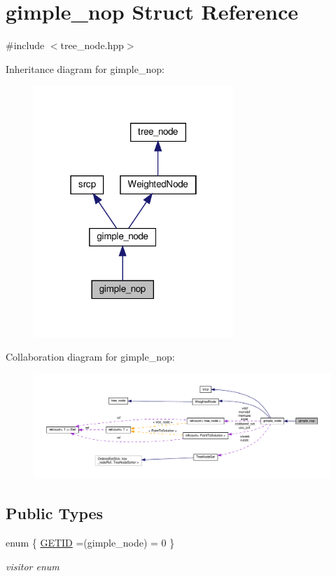 \hypertarget{structgimple__nop}{}\section{gimple\+\_\+nop Struct Reference}
\label{structgimple__nop}


{\ttfamily \#include $<$tree\+\_\+node.\+hpp$>$}



Inheritance diagram for gimple\+\_\+nop\+:
\nopagebreak
\begin{figure}[H]
\begin{center}
\leavevmode
\includegraphics[width=214pt]{dd/dda/structgimple__nop__inherit__graph}
\end{center}
\end{figure}


Collaboration diagram for gimple\+\_\+nop\+:
\nopagebreak
\begin{figure}[H]
\begin{center}
\leavevmode
\includegraphics[width=350pt]{d9/d32/structgimple__nop__coll__graph}
\end{center}
\end{figure}
\subsection*{Public Types}
\begin{DoxyCompactItemize}
\item 
enum \{ \hyperlink{structgimple__nop_ae66f8186fb2fa09a8013797f85a2fc9daa518909b58e82c8fb6afb8a5be008fb7}{G\+E\+T\+ID} =(gimple\+\_\+node) = 0
 \}\begin{DoxyCompactList}\small\item\em visitor enum \end{DoxyCompactList}
\end{DoxyCompactItemize}

